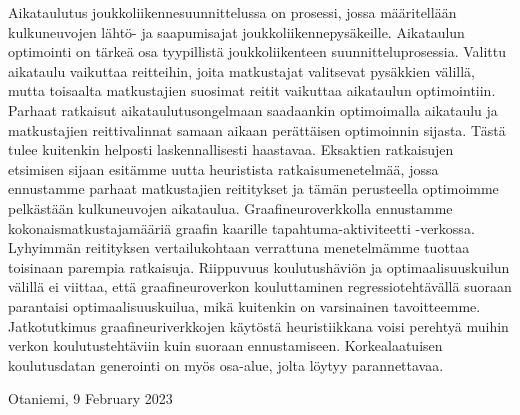 \documentclass[english, 12pt, a4paper, sci, utf8, a-2b, online]{aaltothesis}
\date{28 February 2024}
\begin{document}
\makecoverpage
\makecopyrightpage
\clearpage

\begin{abstractpage}[english]
    \abstracttext{}
\end{abstractpage}


\newpage
{}
\date{26.2.2024}
\begin{abstractpage}[finnish]
    Aikataulutus joukkoliikennesuunnittelussa on prosessi, jossa määritellään kulkuneuvojen lähtö- ja saapumisajat joukkoliikennepysäkeille. Aikataulun optimointi on tärkeä osa tyypillistä joukkoliikenteen suunnitteluprosessia. Valittu aikataulu vaikuttaa reitteihin, joita matkustajat valitsevat pysäkkien välillä, mutta toisaalta matkustajien suosimat reitit vaikuttaa aikataulun optimointiin. Parhaat ratkaisut aikataulutusongelmaan saadaankin optimoimalla aikataulu ja matkustajien reittivalinnat samaan aikaan perättäisen optimoinnin sijasta. Tästä tulee kuitenkin helposti laskennallisesti haastavaa. Eksaktien ratkaisujen etsimisen sijaan esitämme uutta heuristista ratkaisumenetelmää, jossa ennustamme parhaat matkustajien reititykset ja tämän perusteella optimoimme pelkästään kulkuneuvojen aikataulua. Graafineuroverkkolla ennustamme kokonaismatkustajamääriä graafin kaarille tapahtuma-aktiviteetti -verkossa. Lyhyimmän reitityksen vertailukohtaan verrattuna menetelmämme tuottaa toisinaan parempia ratkaisuja. Riippuvuus koulutushäviön ja optimaalisuuskuilun välillä ei viittaa, että graafineuroverkon kouluttaminen regressiotehtävällä suoraan parantaisi optimaalisuuskuilua, mikä kuitenkin on varsinainen tavoitteemme. Jatkotutkimus graafineuriverkkojen käytöstä heuristiikkana voisi perehtyä muihin verkon koulutustehtäviin kuin suoraan ennustamiseen. Korkealaatuisen koulutusdatan generointi on myös osa-alue, jolta löytyy parannettavaa.
\end{abstractpage}


\newpage


\dothesispagenumbering{}


\vspace{5cm}
Otaniemi, 9 February 2023\\
\end{document}
